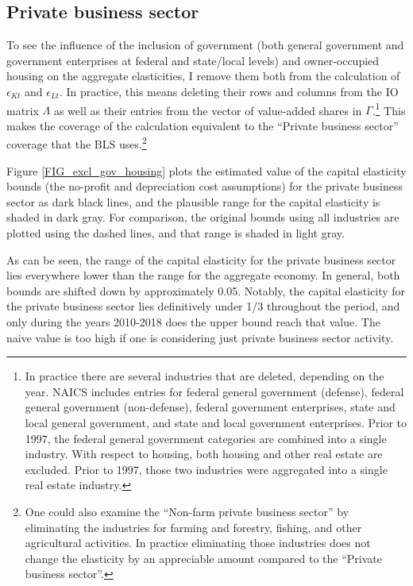 \documentclass[11pt]{article}
\begin{document}
\subsection{Private business sector}
To see the influence of the inclusion of government (both general government and government enterprises at federal and state/local levels) and owner-occupied housing on the aggregate elasticities, I remove them both from the calculation of $\epsilon_{Kt}$ and $\epsilon_{Lt}$. In practice, this means deleting their rows and columns from the IO matrix $\Lambda$ as well as their entries from the vector of value-added shares in $\Gamma$.\footnote{In practice there are several industries that are deleted, depending on the year. NAICS includes entries for federal general government (defense), federal general government (non-defense), federal government enterprises, state and local general government, and state and local government enterprises. Prior to 1997, the federal general government categories are combined into a single industry. With respect to housing, both housing and other real estate are excluded. Prior to 1997, those two industries were aggregated into a single real estate industry.} This makes the coverage of the calculation equivalent to the ``Private business sector'' coverage that the BLS uses.\footnote{One could also examine the ``Non-farm private business sector'' by eliminating the industries for farming and forestry, fishing, and other agricultural activities. In practice eliminating those industries does not change the elasticity by an appreciable amount compared to the ``Private business sector''.} 

Figure \ref{FIG_excl_gov_housing} plots the estimated value of the capital elasticity bounds (the no-profit and depreciation cost assumptions) for the private business sector as dark black lines, and the plausible range for the capital elasticity is shaded in dark gray. For comparison, the original bounds using all industries are plotted using the dashed lines, and that range is shaded in light gray. 

As can be seen, the range of the capital elasticity for the private business sector lies everywhere lower than the range for the aggregate economy. In general, both bounds are shifted down by approximately 0.05. Notably, the capital elasticity for the private business sector lies definitively under 1/3 throughout the period, and only during the years 2010-2018 does the upper bound reach that value. The naive value is too high if one is considering just private business sector activity.  
\end{document}
